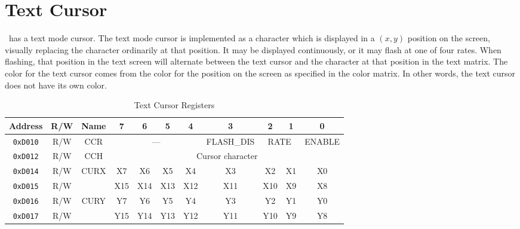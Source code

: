 \section*{Text Cursor}

\jr\ has a text mode cursor. The text mode cursor is implemented as a character which is displayed in a $(x, y)$ position on the screen, visually replacing the character ordinarily at that position. It may be displayed continuously, or it may flash at one of four rates. When flashing, that position in the text screen will alternate between the text cursor and the character at that position in the text matrix. The color for the text cursor comes from the color for the position on the screen as specified in the color matrix. In other words, the text cursor does not have its own color.

\begin{table}[ht]
    \begin{center}
        \begin{tabular}{|c|c|c|c|c|c|c|c|c|c|c|} \hline
            Address & R/W & Name & 7 & 6 & 5 & 4 & 3 & 2 & 1 & 0 \\\hline\hline
            \verb+0xD010+ & R/W & CCR & \multicolumn{4}{|c|}{---} & FLASH\_DIS & \multicolumn{2}{|c|}{RATE} & ENABLE \\ \hline
            \verb+0xD012+ & R/W & CCH & \multicolumn{8}{|c|}{Cursor character} \\ \hline
            \verb+0xD014+ & R/W & \multirow{2}{*}{CURX} & X7 & X6 & X5 & X4 & X3 & X2 & X1 & X0 \\ \cline{1-2}\cline{4-11}
            \verb+0xD015+ & R/W &  & X15 & X14 & X13 & X12 & X11 & X10 & X9 & X8 \\ \hline
            \verb+0xD016+ & R/W & \multirow{2}{*}{CURY} & Y7 & Y6 & Y5 & Y4 & Y3 & Y2 & Y1 & Y0 \\ \cline{1-2}\cline{4-11}
            \verb+0xD017+ & R/W &  & Y15 & Y14 & Y13 & Y12 & Y11 & Y10 & Y9 & Y8 \\ \hline
        \end{tabular}
    \end{center}
    \caption{Text Cursor Registers}
    \label{tab:txt_crsr_reg}
\end{table}

